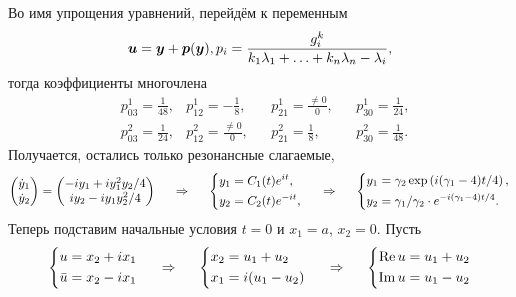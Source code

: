 Во имя упрощения уравнений, перейдём к переменным 
\begin{equation*}
    \vc{u} = \vc{y} + \vc{p}(\vc{y}),
    p_i = 
    \frac{g_i^k}{k_1 \lambda_1 + \ldots + k_n \lambda_n - \lambda_i},
\end{equation*}
тогда коэффициенты многочлена
\begin{align*}
    &p_{03}^1 = \frac{1}{48}, 
    &p_{12}^1 = -\frac{1}{8},
    &&p_{21}^1 = \frac{\neq 0}{0},
    &&p_{30}^1 = \frac{1}{24}, \\
    &p_{03}^2 = \frac{1}{24}, 
    &p_{12}^2 = \frac{\neq 0}{0},
    &&p_{21}^2 = \frac{1}{8},
    &&p_{30}^2 = \frac{1}{48}.
\end{align*}
Получается, остались только резонансные слагаемые,
\begin{equation*}
    \begin{pmatrix}
        \dot{y}_1 \\ \dot{y}_2
    \end{pmatrix} = 
    \begin{pmatrix}
        -iy_1 + i y_1^2 y_2/4 \\
        i y_2 - i y_1 y_2^2 / 4
    \end{pmatrix}
    \hspace{0.5cm} \Rightarrow \hspace{0.5cm}
    \left\{\begin{aligned}
        y_1 &= C_1(t) e^{it}, \\
        y_2 &= C_2(t) e^{-it},
    \end{aligned}\right.
    \hspace{0.5cm} \Rightarrow \hspace{0.5cm}
    \left\{\begin{aligned}
        y_1 &= \gamma_2 \exp\left(i(\gamma_1-4)t/4\right), \\
        y_2 &= \gamma_1/\gamma_2 \cdot e^{-i(\gamma_1-4)t/4}.
    \end{aligned}\right.
\end{equation*}
Теперь подставим начальные условия $t=0$ и $x_1=a$, $x_2=0$. Пусть
\begin{equation*}
    \left\{\begin{aligned}
        u &= x_2 + i x_1 \\
        \bar{u} &= x_2 - i x_1
    \end{aligned}\right.
    \hspace{0.5cm} \Rightarrow \hspace{0.5cm}
    \left\{\begin{aligned}
        x_2 &= u_1 + u_2 \\
        x_1 &= i(u_1-u_2)
    \end{aligned}\right.
    \hspace{0.5cm} \Rightarrow \hspace{0.5cm}
    \left\{\begin{aligned}
        \Re u &= u_1 + u_2 \\
        \Im u &= u_1 - u_2
    \end{aligned}\right.
\end{equation*}
